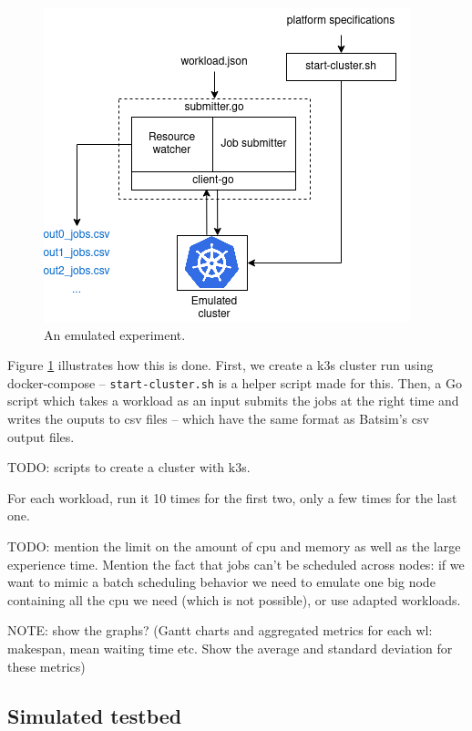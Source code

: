 \documentclass[12pt, a4paper]{memoir}
\begin{document}
\begin{figure}[H]
	\centering
	\includegraphics[scale=0.7]{./imgs/prot-k3s.png}
	\caption{An emulated experiment.}
	\label{fig:emulated-expe}
\end{figure}

Figure \ref{fig:emulated-expe} illustrates how this is done. First, we create a
k3s cluster run using docker-compose -- \texttt{start-cluster.sh} is a helper
script made for this. Then, a Go script which takes a workload as an input
submits the jobs at the right time and writes the ouputs to csv files -- which
have the same format as Batsim's csv output files.

TODO: scripts to create a cluster with k3s. 

For each workload, run it 10 times for the first two, only a few times for the
last one.

TODO: mention the limit on the amount of cpu and memory as well as the large
experience time. Mention the fact that jobs can't be scheduled across nodes:
if we want to mimic a batch scheduling behavior we need to emulate one big node
containing all the cpu we need (which is not possible), or use adapted workloads.

NOTE: show the graphs? (Gantt charts and aggregated metrics for each wl: makespan, mean waiting time etc. Show the average and standard deviation for these metrics)
\subsection{Simulated testbed}
\end{document}
